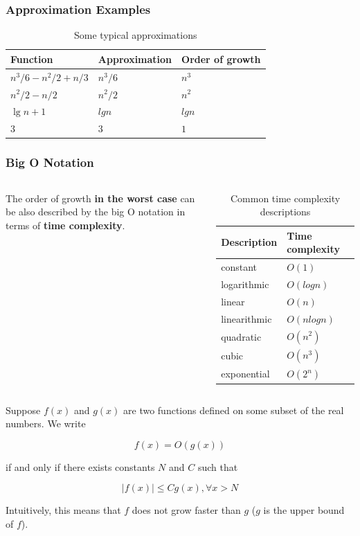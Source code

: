 \documentclass[aspectratio=169, 14pt]{beamer}
\begin{document}
\begin{frame}[fragile]
    \frametitle{Approximation Examples}

    \begin{table}
        \caption{Some typical approximations}
        \begin{tabular}{lll}
          \toprule
          Function & Approximation & Order of growth \\
          \midrule
          $n^3/6 - n^2/2 + n/3$ & $n^3/6$ & $n^3$ \\
          $n^2/2 - n/2$ & $n^2/2$ & $n^2$ \\
          $\lg{n} + 1$ & $lg{n}$ & $lg{n}$ \\
          $3$ & $3$ & $1$ \\
          \bottomrule
        \end{tabular}
    \end{table}
\end{frame}
\begin{frame}
    \frametitle{Big O Notation}

    \begin{columns}
        The order of growth \textbf{in the worst case} can be also described by the \alert{big O} notation in terms of \textbf{time complexity}. 
        \begin{table}
            \caption{Common time complexity descriptions}
            \begin{tabular}{ll}
              \toprule
              Description & Time complexity \\
              \midrule
              constant	& $O(1)$ \\
        logarithmic	& $O(log{n})$ \\
        linear	& $O(n)$ \\
        linearithmic	& $O(nlog{n})$ \\
        quadratic	& $O(n^2)$ \\
        cubic	& $O(n^3)$ \\
        exponential	& $O(2^n)$ \\
              \bottomrule
            \end{tabular}
        \end{table}
    \end{columns}
\end{frame}

\begin{frame}
Suppose $f(x)$ and $g(x)$ are two functions defined on some subset of the real numbers. We write 

\[f(x) = O(g(x))\]

if and only if there exists constants $N$ and $C$ such that

\[|f(x)| \leq Cg(x), \forall x > N\]
    

Intuitively, this means that $f$ does not grow faster than $g$ ($g$ is the \alert{upper bound} of $f$).

\end{frame}
\end{document}
